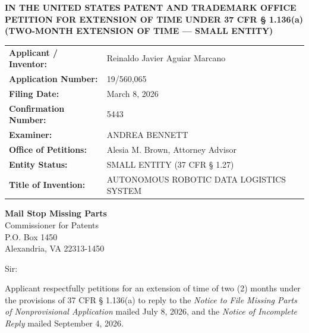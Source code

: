 \documentclass[11pt,letterpaper]{article}
\begin{document}
\thispagestyle{empty}

\begin{center}
    \textbf{\large IN THE UNITED STATES PATENT AND TRADEMARK OFFICE} \\
    \vspace{0.3cm}
    \textbf{\large PETITION FOR EXTENSION OF TIME UNDER 37 CFR \S{} 1.136(a)} \\
    \textbf{\normalsize (TWO-MONTH EXTENSION OF TIME --- SMALL ENTITY)}
\end{center}

\vspace{0.4cm}
\noindent\begin{tabular}{p{2.3in}p{4.0in}}
\textbf{Applicant / Inventor:} & Reinaldo Javier Aguiar Marcano \\
\textbf{Application Number:} & 19/560,065 \\
\textbf{Filing Date:} & March 8, 2026 \\
\textbf{Confirmation Number:} & 5443 \\
\textbf{Examiner:} & ANDREA BENNETT \\
\textbf{Office of Petitions:} & Alesia M. Brown, Attorney Advisor \\
\textbf{Entity Status:} & SMALL ENTITY (37 CFR \S{} 1.27) \\
\textbf{Title of Invention:} & AUTONOMOUS ROBOTIC DATA LOGISTICS SYSTEM \\
\end{tabular}

\vspace{0.5cm}
\noindent\textbf{Mail Stop Missing Parts} \\
Commissioner for Patents \\
P.O. Box 1450 \\
Alexandria, VA 22313-1450

\vspace{0.2cm}
Sir:

Applicant respectfully petitions for an extension of time of two (2) months under the provisions of 37 CFR \S{} 1.136(a) to reply to the \textit{Notice to File Missing Parts of Nonprovisional Application} mailed July 8, 2026, and the \textit{Notice of Incomplete Reply} mailed September 4, 2026.
\end{document}
